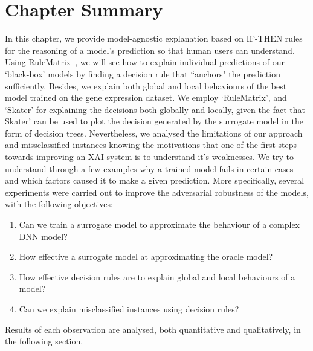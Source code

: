 \section{Chapter Summary} \label{chapter_7:conclusion}
In this chapter, we provide model-agnostic explanation based on IF-THEN rules for the reasoning of a model's prediction so that human users can understand. %
Using RuleMatrix~\cite{ming2018rulematrix}, we will see how to explain individual predictions of our `black-box' models by finding a decision rule that ``anchors" the prediction sufficiently. Besides, we explain both global and local behaviours of the best model trained on the gene expression dataset. We employ `RuleMatrix', and `Skater' for explaining the decisions both globally and locally, given the fact that Skater' can be used to plot the decision generated by the surrogate model in the form of decision trees.  
\hspace*{3.5mm} Nevertheless, we analysed the limitations of our approach and missclassified instances knowing the motivations that one of the first steps towards improving an XAI system is to understand it’s weaknesses. We try to understand through a few examples why a trained model fails in certain cases and which factors caused it to make a given prediction. More specifically, several experiments were carried out to improve the adversarial robustness of the models, with the following objectives:

\begin{enumerate}[noitemsep]
    \item Can we train a surrogate model to approximate the behaviour of a complex DNN model? 
    \item How effective a surrogate model at approximating the oracle model?  
    \item How effective decision rules are to explain global and local behaviours of a model?   
    \item Can we explain misclassified instances using decision rules? 
\end{enumerate}

\hspace*{3.5mm} Results of each observation are analysed, both quantitative and qualitatively, in the following section.

